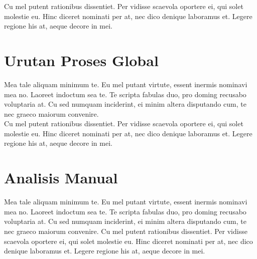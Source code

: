 Cu mel putent rationibus dissentiet. Per vidisse scaevola oportere ei, qui solet molestie eu. Hinc diceret nominati per at, nec dico denique laboramus et. Legere regione his at, aeque decore in mei.\\

\section{Urutan Proses Global}
Mea tale aliquam minimum te. Eu mel putant virtute, essent inermis nominavi mea no. Laoreet indoctum sea te. Te scripta fabulas duo, pro doming recusabo voluptaria at. Cu sed numquam inciderint, ei minim altera disputando cum, te nec graeco maiorum convenire.\\
Cu mel putent rationibus dissentiet. Per vidisse scaevola oportere ei, qui solet molestie eu. Hinc diceret nominati per at, nec dico denique laboramus et. Legere regione his at, aeque decore in mei.\\

\section{Analisis Manual}
Mea tale aliquam minimum te. Eu mel putant virtute, essent inermis nominavi mea no. Laoreet indoctum sea te. Te scripta fabulas duo, pro doming recusabo voluptaria at. Cu sed numquam inciderint, ei minim altera disputando cum, te nec graeco maiorum convenire. Cu mel putent rationibus dissentiet. Per vidisse scaevola oportere ei, qui solet molestie eu. Hinc diceret nominati per at, nec dico denique laboramus et. Legere regione his at, aeque decore in mei.\\

